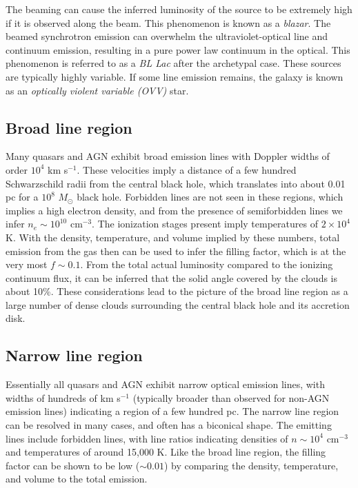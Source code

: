 The beaming can cause the inferred luminosity of the source to be
extremely high if it is observed along the beam. This phenomenon is
known as a {\it blazar}. The beamed synchrotron emission can overwhelm
the ultraviolet-optical line and continuum emission, resulting in a
pure power law continuum in the optical. This phenomenon is referred
to as a {\it BL Lac} after the archetypal case. These sources are
typically highly variable. If some line emission remains, the galaxy
is known as an {\it optically violent variable (OVV)} star.

\subsection{Broad line region}

Many quasars and AGN exhibit broad emission lines with Doppler widths
of order $10^4$ km s$^{-1}$. These velocities imply a distance of a
few hundred Schwarzschild radii from the central black hole, which
translates into about 0.01 pc for a $10^8$ $M_\odot$ black
hole. Forbidden lines are not seen in these regions, which implies a
high electron density, and from the presence of semiforbidden lines we
infer $n_e \sim 10^{10}$ cm$^{-3}$. The ionization stages present
imply temperatures of $2\times 10^4$ K. With the density, temperature,
and volume implied by these numbers, total emission from the gas then
can be used to infer the filling factor, which is at the very most
$f\sim 0.1$. From the total actual luminosity compared to the ionizing
continuum flux, it can be inferred that the solid angle covered by the
clouds is about 10\%. These considerations lead to the picture of the
broad line region as a large number of dense clouds surrounding the
central black hole and its accretion disk.

\subsection{Narrow line region}

Essentially all quasars and AGN exhibit narrow optical emission lines,
with widths of hundreds of km s$^{-1}$ (typically broader than
observed for non-AGN emission lines) indicating a region of a few
hundred pc. The narrow line region can be resolved in many cases, and
often has a biconical shape. The emitting lines include forbidden
lines, with line ratios indicating densities of $n\sim 10^4$ cm$^{-3}$
and temperatures of around 15,000 K. Like the broad line region, the
filling factor can be shown to be low ($\sim 0.01$) by comparing the
density, temperature, and volume to the total emission.

